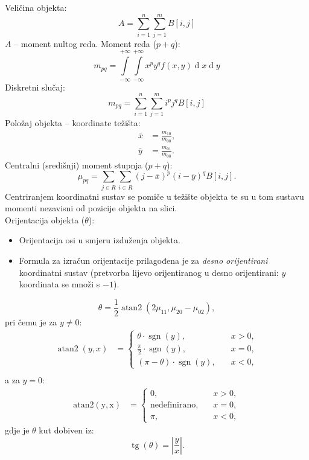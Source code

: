 \documentclass[11pt,english]{article}
\begin{document}
Veličina objekta:
$$A = \sum\limits^n_{i=1}\sum\limits^m_{j=1} B[i,j]$$
$A$ -- moment nultog reda.
Moment reda ($p+q$):
$$m_{pq} = \int\limits^{+\infty}_{-\infty}\int\limits^{+\infty}_{-\infty}x^py^q f(x,y) \operatorname{d}x \operatorname{d}y$$
Diskretni slučaj:
$$m_{pq} = \sum\limits^n_{i=1}\sum\limits^m_{j=1} i^p j^q B[i,j]$$
Položaj objekta -- koordinate težišta:
\begin{align*}
\bar x &= \frac{m_{10}}{m_{00}},\\
\bar y &= \frac{m_{01}}{m_{00}}.
\end{align*}
Centralni (središnji) moment stupnja ($p+q$):
$$\mu_{pq} =\sum_{j \in R}\sum_{i \in R} (j-\bar x)^p(i-\bar y)^q B[i,j].$$
Centriranjem koordinatni sustav se pomiče u težište objekta te su u tom sustavu momenti nezavisni od pozicije objekta na slici.\\
Orijentacija objekta ($\theta$):
\begin{itemize}
  \item Orijentacija osi u smjeru izduženja objekta.
  \item Formula za izračun orijentacije prilagođena je za \emph{desno orijentirani} koordinatni sustav (pretvorba lijevo orijentiranog u desno orijentirani: $y$ koordinata se množi s $-1$).
\end{itemize}
$$\theta = \frac{1}{2}\operatorname{atan2}\left (2\mu_{11}, \mu_{20}-\mu_{02} \right ),$$
pri čemu je za $y \ne 0$:
\begin{align*}
  \operatorname{atan2}(y,x) &= \left \{ \begin{array}{ll}
    \theta \cdot \operatorname{sgn}(y),&\quad x>0,\\
    \frac{\pi}{2}\cdot\operatorname{sgn}(y),&\quad x=0,\\
    (\pi-\theta)\cdot\operatorname{sgn}(y),&\quad x<0,
  \end{array}\right.\\
\end{align*}
a za $y = 0$:
\begin{align*}
  \operatorname{atan2(y,x)} &= \left \{ \begin{array}{ll}
    0,&\quad x>0,\\
    \text{nedefinirano},&\quad x=0,\\
    \pi,&\quad x<0,
  \end{array}\right.
\end{align*}
gdje je $\theta$ kut dobiven iz:
$$\operatorname{tg}(\theta) = \left \vert \frac{y}{x}\right \vert.$$
\end{document}
